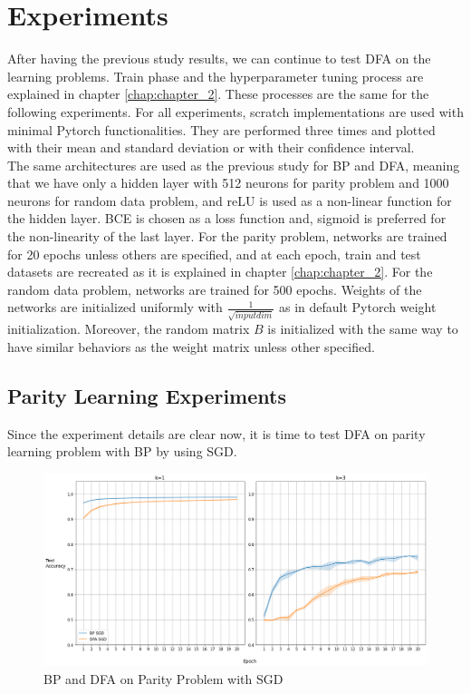 \documentclass[a4paper, nobind]{templates/ociamthesis}
\begin{document}
\hypertarget{chap:chapter_3}{%
\chapter{Experiments}\label{chap:chapter_3}}

\noindent After having the previous study results, we can continue to test DFA on the learning problems. Train phase and the hyperparameter tuning process are explained in chapter \ref{chap:chapter_2}. These processes are the same for the following experiments. For all experiments, scratch implementations are used with minimal Pytorch functionalities. They are performed three times and plotted with their mean and standard deviation or with their confidence interval.\\
The same architectures are used as the previous study for BP and DFA, meaning that we have only a hidden layer with 512 neurons for parity problem and 1000 neurons for random data problem, and reLU is used as a non-linear function for the hidden layer. BCE is chosen as a loss function and, sigmoid is preferred for the non-linearity of the last layer. For the parity problem, networks are trained for 20 epochs unless others are specified, and at each epoch, train and test datasets are recreated as it is explained in chapter \ref{chap:chapter_2}. For the random data problem, networks are trained for 500 epochs. Weights of the networks are initialized uniformly with \(\frac{1}{\sqrt{input dim}}\) as in default Pytorch weight initialization. Moreover, the random matrix \(B\) is initialized with the same way to have similar behaviors as the weight matrix unless other specified.

\hypertarget{parity-learning-experiments}{%
\section{Parity Learning Experiments}\label{parity-learning-experiments}}

Since the experiment details are clear now, it is time to test DFA on parity learning problem with BP by using SGD.

\begin{figure}

{\centering \includegraphics[width=1\linewidth]{figures/3_k13_SGD_DFAvsBP} 

}

\caption{BP and DFA on Parity Problem with SGD}\label{fig:BPvsDFA}
\end{figure}
\end{document}
